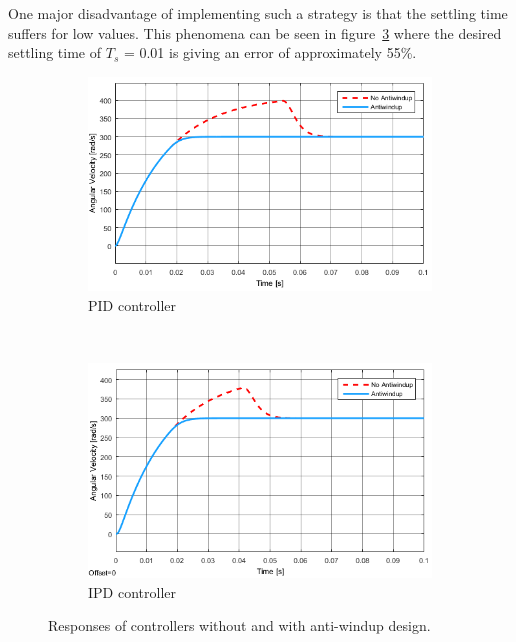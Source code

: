 One major disadvantage of implementing such a strategy is that the settling time suffers for low values. This phenomena can be seen in figure~\ref{fig:antiwindupresponses} where the desired settling time of $T_s$ = 0.01 is giving an error of approximately 55\%. 
\begin{figure}
	\centering
	\begin{subfigure}[b]{0.45\textwidth}
		\includegraphics[width=\textwidth]{graphics/pidwindupresponse}
		\caption{PID controller}
		\label{fig:pidwindupresponse}
	\end{subfigure}
	~ %
	\begin{subfigure}[b]{0.45\textwidth}
		\includegraphics[width=\textwidth]{graphics/ipdwindupresponse}
		\caption{IPD controller}
		\label{fig:ipdwindupresponse}
	\end{subfigure}
	\caption{Responses of controllers without and with anti-windup design.}\label{fig:antiwindupresponses}
\end{figure}

